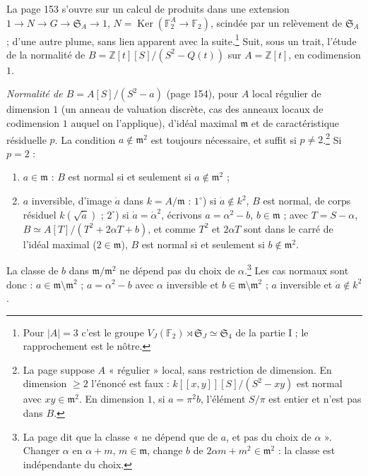 \documentclass[11pt,a4paper]{article}
\begin{document}
La page 153 s'ouvre sur un calcul de produits dans une extension $1 \to N \to G
\to \mathfrak{S}_A \to 1$, $N = \operatorname{Ker}(\mathbb{F}_2^A \to
\mathbb{F}_2)$, scindée par un relèvement de $\mathfrak{S}_A$ ; d'une autre
plume, sans lien apparent avec la suite.\footnote{Pour $|A| = 3$ c'est le
groupe $V_J(\mathbb{F}_2) \rtimes \mathfrak{S}_J \simeq \mathfrak{S}_4$ de la
partie I ; le rapprochement est le nôtre.} Suit, sous un trait, l'étude de la
normalité de $B = \mathbb{Z}[t][S]/(S^2 - Q(t))$ sur $A = \mathbb{Z}[t]$, en
codimension $1$.

\emph{Normalité de $B = A[S]/(S^2 - a)$} (page 154), pour $A$ local régulier de
dimension $1$ (un anneau de valuation discrète, cas des anneaux locaux de
codimension $1$ auquel on l'applique), d'idéal maximal $\mathfrak{m}$ et de
caractéristique résiduelle $p$. La condition $a \notin \mathfrak{m}^2$ est
toujours nécessaire, et suffit si $p \neq 2$.\footnote{La page suppose $A$
« régulier » local, sans restriction de dimension. En dimension $\geq 2$
l'énoncé est faux : $k[[x, y]][S]/(S^2 - xy)$ est normal avec $xy \in
\mathfrak{m}^2$. En dimension $1$, si $a = \pi^2 b$, l'élément $S/\pi$ est
entier et n'est pas dans $B$.} Si $p = 2$ :
\begin{enumerate}
\item[a)] $a \in \mathfrak{m}$ : $B$ est normal si et seulement si $a \notin
\mathfrak{m}^2$ ;
\item[b)] $a$ inversible, d'image $\dot a$ dans $k = A/\mathfrak{m}$ :
$1^\circ$) si $\dot a \notin k^2$, $B$ est normal, de corps résiduel $k(\sqrt{\dot
a})$ ; $2^\circ$) si $\dot a = \dot\alpha^2$, écrivons $a = \alpha^2 - b$, $b \in
\mathfrak{m}$ ; avec $T = S - \alpha$, $B \simeq A[T]/(T^2 + 2\alpha T + b)$, et
comme $T^2$ et $2\alpha T$ sont dans le carré de l'idéal maximal ($2 \in
\mathfrak{m}$), $B$ est normal si et seulement si $b \notin \mathfrak{m}^2$.
\end{enumerate}
La classe de $b$ dans $\mathfrak{m}/\mathfrak{m}^2$ ne dépend pas du choix de
$\alpha$.\footnote{La page dit que la classe « ne dépend que de $a$, et pas du choix de $\alpha$ ». Changer $\alpha$ en $\alpha + m$, $m \in \mathfrak{m}$,
change $b$ de $2\alpha m + m^2 \in \mathfrak{m}^2$ : la classe est indépendante
du choix.} Les cas normaux sont donc : $a \in \mathfrak{m} \setminus
\mathfrak{m}^2$ ; $a = \alpha^2 - b$ avec $\alpha$ inversible et $b \in
\mathfrak{m} \setminus \mathfrak{m}^2$ ; $a$ inversible et $\dot a \notin k^2$.
\end{document}
